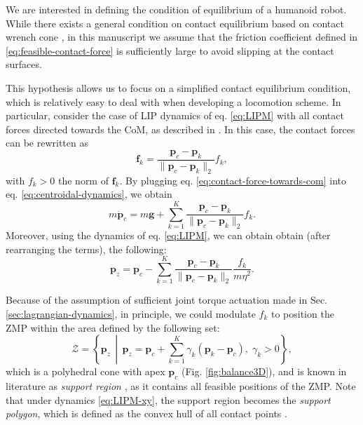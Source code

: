We are interested in defining the condition of equilibrium of a humanoid robot.
While there exists a general condition on contact
equilibrium based on contact wrench cone \cite{Caron2015RSS}, in this manuscript
we assume that the friction coefficient defined in
\eqref{eq:feasible-contact-force} is sufficiently large to avoid slipping at the
contact surfaces.

This hypothesis allows us to focus on a simplified contact equilibrium
condition, which is relatively easy to deal with when developing a locomotion
scheme. In particular, consider the case of LIP dynamics of eq. \eqref{eq:LIPM}
with all contact forces directed towards the CoM, as described in
\cite{Sugihara2002ICRA}.
In this case, the contact forces can be rewritten as
\begin{equation}
    \label{eq:contact-force-towards-com}
    \bm{f}_k = \frac{\bm{p}_c - \bm{p}_k}{\| \bm{p}_c - \bm{p}_k \|_2} f_k,
\end{equation}
with $f_k>0$ the norm of $\bm{f}_k$. By plugging eq.
\eqref{eq:contact-force-towards-com} into eq.
\eqref{eq:centroidal-dynamics}, we obtain
\begin{equation}
    m \ddot{\bm{p}}_c = m \bm{g} + \sum_{k=1}^K \frac{\bm{p}_c - \bm{p}_k}{\| \bm{p}_c - \bm{p}_k \|_2} f_k.
\end{equation}
Moreover, using the dynamics of eq. \eqref{eq:LIPM}, we can obtain
obtain (after rearranging the terms), the following:
\begin{equation*}
    \bm{p}_z = \bm{p}_c - \sum_{k=1}^K \frac{\bm{p}_c - \bm{p}_k}{\| \bm{p}_c - \bm{p}_k \|_2} \frac{f_k}{m \eta^2}.
\end{equation*}

Because of the assumption of sufficient joint torque actuation made in Sec.
\ref{sec:lagrangian-dynamics}, in principle, we could modulate $f_k$ to position
the ZMP within the area defined by the following set:
\begin{equation}
    \mathcal{Z} = \left\{ \bm{p}_z \,\middle\vert\, \bm{p}_z = \bm{p}_c + \sum_{k=1}^K \gamma_k (\bm{p}_k - \bm{p}_c), \; \gamma_k > 0  \right\},
    \label{eq:ZMP-polyhedral-cone}
\end{equation}
which is a polyhedral cone with apex $\bm{p}_c$ (Fig. \ref{fig:balance3D}), and
is known in literature as \textit{support region} \cite{Sugihara2021ICRA},
as it contains all feasible positions of the ZMP. Note that under dynamics
\eqref{eq:LIPM-xy}, the support region becomes the \textit{support
polygon}, which is defined as the convex hull of all contact points
\cite{SardainBessonnet2004}.

